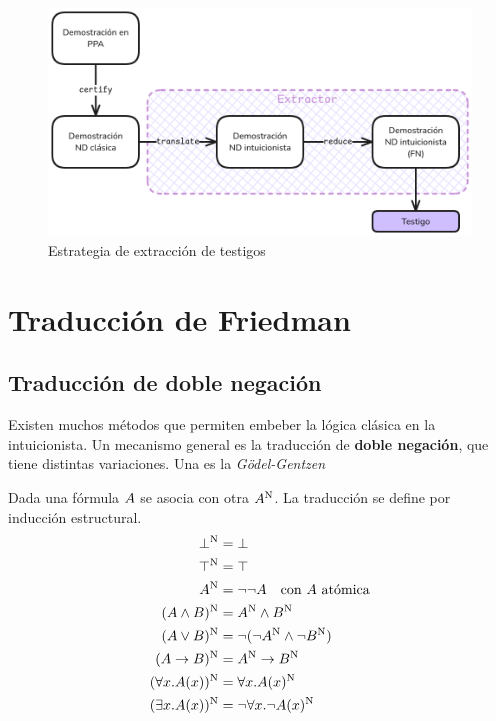 \begin{figure}
    \includegraphics[scale=0.35]{img/fri-extract-strategy.png}
    \centering
    \caption{Estrategia de extracción de testigos}
    \label{fri:fig:strat}
\end{figure}

\section{Traducción de Friedman}
\label{fri:sec:fri}

\subsection{Traducción de doble negación}

Existen muchos métodos que permiten embeber la lógica clásica en la
intuicionista. Un mecanismo general es la traducción de
\textbf{doble negación}, que tiene distintas variaciones. Una es la
\textit{Gödel-Gentzen} \cite{Avigad1998-FEFOFD}

\begin{definition} Dada una fórmula $A$
    se asocia con otra $A^{\text{N}}$. La traducción se define por inducción
    estructural.
    \begin{align*}
        \bot^{\text{N}}                      & = \bot                                           \\
        \top^{\text{N}}                       & = \top                                            \\
        A^{\text{N}}                        & = \neg\neg A \quad \text{con $A$ atómica} \\
        (A \wedge B)^{\text{N}}       & = A^{\text{N}} \wedge B^{\text{N}}                    \\
        (A \vee B)^{\text{N}}        & = \neg(\neg A^{\text{N}} \wedge \neg B^{\text{N}})   \\
        (A \to B)^{\text{N}}       & = A^{\text{N}} \to B^{\text{N}}                    \\
        (\forall x . A(x))^{\text{N}} & = \forall x . A(x)^{\text{N}}                   \\
        (\exists x . A(x))^{\text{N}} & = \neg \forall x . \neg A(x)^{\text{N}}
    \end{align*}
\end{definition}


